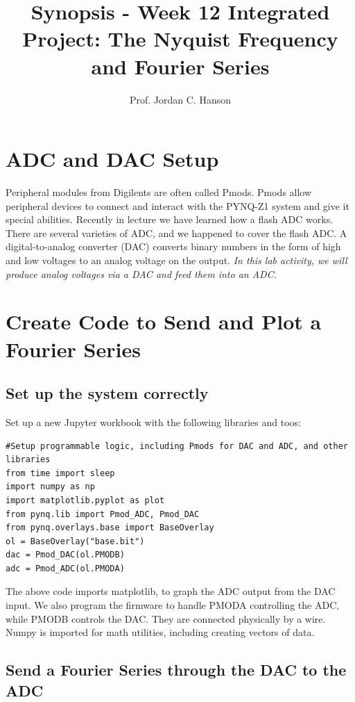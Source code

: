 \documentclass{article}
\begin{document}
\title{Synopsis - Week 12 Integrated Project: The Nyquist Frequency and Fourier Series}
\author{Prof. Jordan C. Hanson}

\maketitle

\section{ADC and DAC Setup}

Peripheral modules from Digilents are often called Pmods.  Pmods allow peripheral devices to connect and interact with the PYNQ-Z1 system and give it special abilities.  Recently in lecture we have learned how a flash ADC works.  There are several varieties of ADC, and we happened to cover the flash ADC.  A digital-to-analog converter (DAC) converts binary numbers in the form of high and low voltages to an analog voltage on the output.  \textit{In this lab activity, we will produce analog voltages via a DAC and feed them into an ADC.}

\section{Create Code to Send and Plot a Fourier Series}

\subsection{Set up the system correctly}

Set up a new Jupyter workbook with the following libraries and toos:

\begin{verbatim}
#Setup programmable logic, including Pmods for DAC and ADC, and other libraries
from time import sleep
import numpy as np
import matplotlib.pyplot as plot
from pynq.lib import Pmod_ADC, Pmod_DAC
from pynq.overlays.base import BaseOverlay
ol = BaseOverlay("base.bit")
dac = Pmod_DAC(ol.PMODB)
adc = Pmod_ADC(ol.PMODA)
\end{verbatim}

The above code imports matplotlib, to graph the ADC output from the DAC input.  We also program the firmware to handle PMODA controlling the ADC, while PMODB controls the DAC.  They are connected physically by a wire.  Numpy is imported for math utilities, including creating vectors of data.

\subsection{Send a Fourier Series through the DAC to the ADC}
\end{document}
